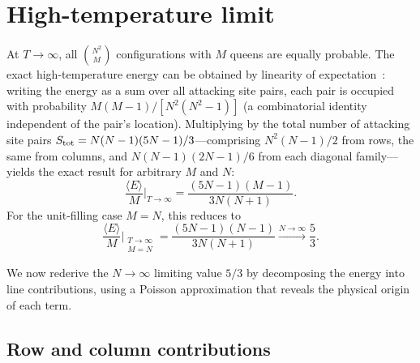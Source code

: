 \documentclass[aps, pre, reprint, amsmath, amssymb, superscriptaddress, floatfix]{revtex4-2}
\begin{document}
\section{High-temperature limit}
\label{sec:highT}

At $T \to \infty$, all $\binom{N^2}{M}$ configurations with $M$
queens are equally probable.  The exact high-temperature energy can be
obtained by linearity of expectation~\cite{Polson2024}: writing the
energy as a sum over all attacking site pairs, each pair is occupied
with probability $M(M-1)/[N^2(N^2-1)]$ (a combinatorial identity
independent of the pair's location).  Multiplying by the total number
of attacking site pairs $S_{\rm tot} = N(N-1)(5N-1)/3$---comprising
$N^2(N-1)/2$ from rows, the same from columns, and $N(N-1)(2N-1)/6$
from each diagonal family---yields the exact result for arbitrary $M$
and $N$:
\begin{equation}
  \frac{\langle E \rangle}{M}\bigg|_{T \to \infty}
  = \frac{(5N-1)(M-1)}{3N(N+1)}.
  \label{eq:E_highT_general}
\end{equation}
For the unit-filling case $M = N$, this reduces to
\begin{equation}
  \frac{\langle E \rangle}{M}\bigg|_{\substack{T \to \infty \\ M = N}}
  = \frac{(5N-1)(N-1)}{3N(N+1)}
  \xrightarrow{N \to \infty} \frac{5}{3}.
  \label{eq:E_highT}
\end{equation}

We now rederive the $N \to \infty$ limiting value $5/3$ by
decomposing the energy into line contributions, using a Poisson
approximation that reveals the physical origin of each term.

\subsection{Row and column contributions}
\end{document}

